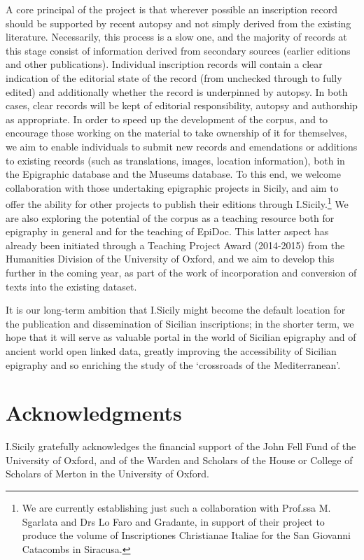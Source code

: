 \documentclass[amsthm,ebook]{saparticle}
\begin{document}
A core principal of the project is that wherever possible an inscription record should be supported by recent autopsy
and not simply derived from the existing literature. Necessarily, this process is a slow one, and the majority of
records at this stage consist of information derived from secondary sources (earlier editions and other publications).
Individual inscription records will contain a clear indication of the editorial state of the record (from unchecked
through to fully edited) and additionally whether the record is underpinned by autopsy. In both cases, clear records
will be kept of editorial responsibility, autopsy and authorship as appropriate. In order to speed up the development
of the corpus, and to encourage those working on the material to take ownership of it for themselves, we aim to enable
individuals to submit new records and emendations or additions to existing records (such as translations, images,
location information), both in the Epigraphic database and the Museums database. To this end, we welcome collaboration
with those undertaking epigraphic projects in Sicily, and aim to offer the ability for other projects to publish their
editions through I.Sicily.\footnote{ We are currently establishing just such a collaboration with Prof.ssa M. Sgarlata
and Drs Lo Faro and Gradante, in support of their project to produce the volume of Inscriptiones Christianae Italiae
for the San Giovanni Catacombs in Siracusa.} We are also exploring the potential of the corpus as a teaching resource
both for epigraphy in general and for the teaching of EpiDoc. This latter aspect has already been initiated through a
Teaching Project Award (2014-2015) from the Humanities Division of the University of Oxford, and we aim to develop this
further in the coming year, as part of the work of incorporation and conversion of texts into the existing dataset.

It is our long-term ambition that I.Sicily might become the default location for the publication and dissemination of
Sicilian inscriptions; in the shorter term, we hope that it will serve as valuable portal in the world of Sicilian
epigraphy and of ancient world open linked data, greatly improving the accessibility of Sicilian epigraphy and so
enriching the study of the `crossroads of the Mediterranean’.




\section*{Acknowledgments}

I.Sicily gratefully acknowledges the financial support of the John Fell Fund of the
University of Oxford, and of the Warden and Scholars of the House or College of Scholars of Merton in the University of
Oxford.




\end{document}
